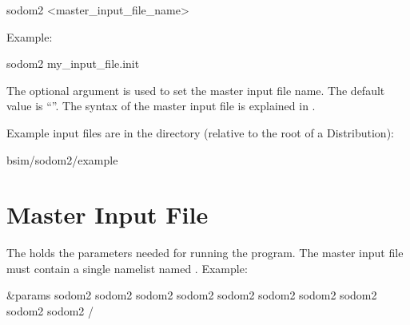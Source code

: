 \documentclass{hitec}     %
\newcommand{\sodom}{\vn{sodom2}\xspace}
\newcommand{\Section}[1]{\section{#1}\vspace*{-1ex}}
\begin{document}
\begin{code}
  sodom2 {<master_input_file_name>}
\end{code}
Example:
\begin{code}
  sodom2 my_input_file.init
\end{code}
The  optional argument is used to set the master input file name. The default value is ``''. The syntax of the master input file is explained
in .

Example input files are in the directory (relative to the root of a Distribution):
\begin{code}
  bsim/sodom2/example
\end{code}

\Section{Master Input File}
\label{s:input}

The  holds the parameters needed for running the \sodom program. The master input file must contain a single namelist named .  Example:
\begin{code}
&params
  sodom2%
  sodom2%
  sodom2%
  sodom2%
  sodom2%
  sodom2%
  sodom2%
  sodom2%
  sodom2%
  sodom2%
/
\end{code}
\end{document}
